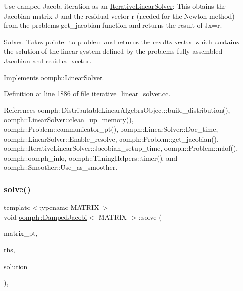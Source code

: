Use damped Jacobi iteration as an \hyperlink{classoomph_1_1IterativeLinearSolver}{Iterative\+Linear\+Solver}\+: This obtains the Jacobian matrix J and the residual vector r (needed for the Newton method) from the problem\textquotesingle{}s get\+\_\+jacobian function and returns the result of Jx=r. 

Solver\+: Takes pointer to problem and returns the results vector which contains the solution of the linear system defined by the problem\textquotesingle{}s fully assembled Jacobian and residual vector. 

Implements \hyperlink{classoomph_1_1LinearSolver_a15ce22542b74ed1826ea485edacbeb6e}{oomph\+::\+Linear\+Solver}.



Definition at line 1886 of file iterative\+\_\+linear\+\_\+solver.\+cc.



References oomph\+::\+Distributable\+Linear\+Algebra\+Object\+::build\+\_\+distribution(), oomph\+::\+Linear\+Solver\+::clean\+\_\+up\+\_\+memory(), oomph\+::\+Problem\+::communicator\+\_\+pt(), oomph\+::\+Linear\+Solver\+::\+Doc\+\_\+time, oomph\+::\+Linear\+Solver\+::\+Enable\+\_\+resolve, oomph\+::\+Problem\+::get\+\_\+jacobian(), oomph\+::\+Iterative\+Linear\+Solver\+::\+Jacobian\+\_\+setup\+\_\+time, oomph\+::\+Problem\+::ndof(), oomph\+::oomph\+\_\+info, oomph\+::\+Timing\+Helpers\+::timer(), and oomph\+::\+Smoother\+::\+Use\+\_\+as\+\_\+smoother.

\mbox{\label{classoomph_1_1DampedJacobi_afe13701a3101a01ae59334d688004a99}} 
\subsubsection{\texorpdfstring{solve()}{solve()}\hspace{0.1cm}{\footnotesize\ttfamily [2/2]}}
{\footnotesize\ttfamily template$<$typename M\+A\+T\+R\+IX $>$ \\
void \hyperlink{classoomph_1_1DampedJacobi}{oomph\+::\+Damped\+Jacobi}$<$ M\+A\+T\+R\+IX $>$\+::solve (\begin{DoxyParamCaption}\item[{\hyperlink{classoomph_1_1DoubleMatrixBase}{Double\+Matrix\+Base} $\ast$const \&}]{matrix\+\_\+pt,  }\item[{const \hyperlink{classoomph_1_1DoubleVector}{Double\+Vector} \&}]{rhs,  }\item[{\hyperlink{classoomph_1_1DoubleVector}{Double\+Vector} \&}]{solution }\end{DoxyParamCaption})\hspace{0.3cm}{\ttfamily [inline]}, {\ttfamily [virtual]}}




